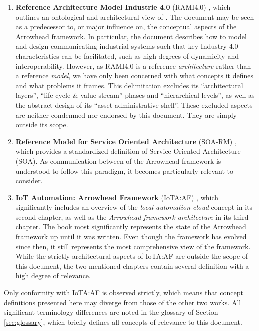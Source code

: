 \begin{enumerate}
\item \textbf{Reference Architecture Model Industrie 4.0} (RAMI4.0) \cite{adolphs2016reference}, which outlines an ontological and architectural view of .
The document may be seen as a predecessor to, or major influence on, the conceptual aspects of the Arrowhead framework.
In particular, the document describes how to model and design communicating industrial systems such that key Industry 4.0 characteristics can be facilitated, such as high degrees of dynamicity and interoperability.
However, as RAMI4.0 is a reference \textit{architecture} rather than a reference \textit{model}, we have only been concerned with what concepts it defines and what problems it frames.
This delimitation excludes its ``architectural layers'', ``life-cycle \& value-stream'' phases and ``hierarchical levels'', as well as the abstract design of its ``asset administrative shell''.
These excluded aspects are neither condemned nor endorsed by this document.
They are simply outside its scope.

\item \textbf{Reference Model for Service Oriented Architecture} (SOA-RM) \cite{mackenzie2006reference}, which provides a standardized definition of Service-Oriented Architecture (SOA).
As communication between  of the Arrowhead framework is understood to follow this paradigm, it becomes particularly relevant to consider.

\item \textbf{IoT Automation: Arrowhead Framework} (IoTA:AF) \cite{delsing2017iot}, which significantly includes an overview of the \textit{local automation cloud} concept in its second chapter, as well as the \textit{Arrowhead framework architecture} in its third chapter.
The book most significantly represents the state of the Arrowhead framework up until it was written.
Even though the framework has evolved since then, it still represents the most comprehensive view of the framework.
While the strictly architectural aspects of IoTA:AF are outside the scope of this document, the two mentioned chapters contain several definition with a high degree of relevance.

\end{enumerate}

Only conformity with IoTA:AF is observed strictly, which means that concept definitions presented here may diverge from those of the other two works.
All significant terminology differences are noted in the glossary of Section \ref{sec:glossary}, which briefly defines all concepts of relevance to this document.

